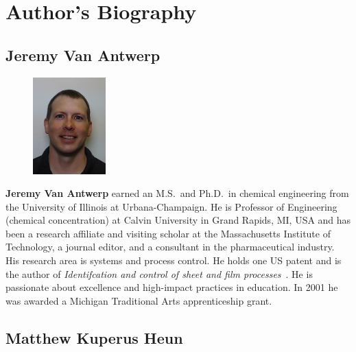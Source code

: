 

\chapter*{Author's Biography}


\section*{Jeremy Van Antwerp}

\setlength{\intextsep}{-7pt}%
\setlength{\columnsep}{8pt}%
\begin{figure}
  \begin{center}
    \includegraphics[width=0.25\textwidth]{headshots/jva-headshot.jpeg}
  \end{center}
\end{figure}
\textbf{Jeremy Van Antwerp} earned an M.S.\ and Ph.D.\ in chemical engineering 
from the University of Illinois at Urbana-Champaign. 
He is Professor of Engineering (chemical concentration)
at Calvin University in Grand Rapids, MI, USA
and has been a research affiliate and visiting scholar at the Massachusetts 
Institute of Technology, a journal editor, and a consultant in the pharmaceutical 
industry.
His research area is systems and process control.
He holds one US patent and is the author of \emph{Identifcation and control of 
sheet and film processes}~\cite{FeaVB2000}.
He is passionate about excellence and high-impact practices in education.
In 2001 he was awarded a Michigan Traditional Arts apprenticeship grant.


\section*{Matthew Kuperus Heun}

